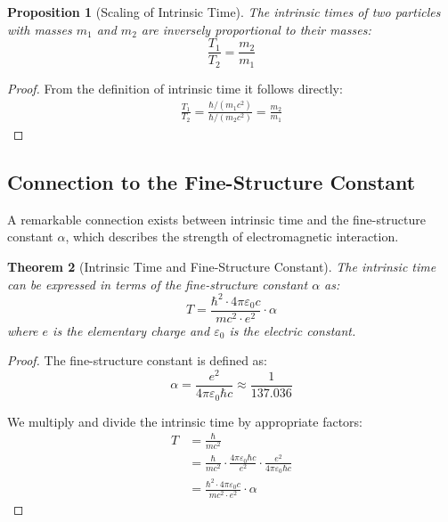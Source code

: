 \documentclass{article}
\newtheorem{theorem}{Theorem}[section]
\newtheorem{proposition}[theorem]{Proposition}
\theoremstyle{definition}
\theoremstyle{remark}
\begin{document}
	\begin{proposition}[Scaling of Intrinsic Time]
		The intrinsic times of two particles with masses $m_1$ and $m_2$ are inversely proportional to their masses:
		\begin{equation}
			\frac{T_1}{T_2} = \frac{m_2}{m_1}
		\end{equation}
	\end{proposition}
	\begin{proof}
		From the definition of intrinsic time it follows directly:
		\begin{align}
			\frac{T_1}{T_2} = \frac{\hbar/(m_1c^2)}{\hbar/(m_2c^2)} = \frac{m_2}{m_1}
		\end{align}
	\end{proof}
	
	\subsection{Connection to the Fine-Structure Constant}
	
	A remarkable connection exists between intrinsic time and the fine-structure constant $\alpha$, which describes the strength of electromagnetic interaction.
	
	\begin{theorem}[Intrinsic Time and Fine-Structure Constant]
		The intrinsic time can be expressed in terms of the fine-structure constant $\alpha$ as:
		\begin{equation}
			T = \frac{\hbar^2 \cdot 4\pi\varepsilon_0 c}{mc^2 \cdot e^2} \cdot \alpha
		\end{equation}
		where $e$ is the elementary charge and $\varepsilon_0$ is the electric constant.
	\end{theorem}
	
	\begin{proof}
		The fine-structure constant is defined as:
		\begin{equation}
			\alpha = \frac{e^2}{4\pi\varepsilon_0\hbar c} \approx \frac{1}{137.036}
		\end{equation}
		
		We multiply and divide the intrinsic time by appropriate factors:
		\begin{align}
			T &= \frac{\hbar}{mc^2} \\
			&= \frac{\hbar}{mc^2} \cdot \frac{4\pi\varepsilon_0\hbar c}{e^2} \cdot \frac{e^2}{4\pi\varepsilon_0\hbar c} \\
			&= \frac{\hbar^2 \cdot 4\pi\varepsilon_0 c}{mc^2 \cdot e^2} \cdot \alpha
		\end{align}
	\end{proof}
	
\end{document}
